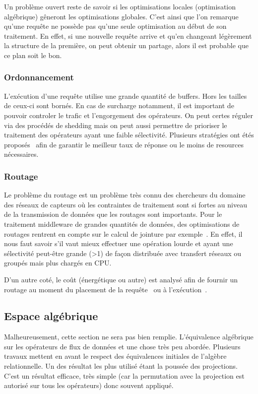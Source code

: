 Un problème ouvert reste de savoir si les optimisations locales (optimisation algébrique) gêneront les optimisations globales. C'est ainsi que l'on remarque qu'une requête ne possède pas qu'une seule optimisation au début de son traitement. En effet, si une nouvelle requête arrive et qu'en changeant légèrement la structure de la première, on peut obtenir un partage, alors il est probable que ce plan soit le bon.

\subsubsection{Ordonnancement}
L'exécution d'une requête utilise une grande quantité de buffers. Hors les tailles de ceux-ci sont bornés. En cas de surcharge notamment, il est important de pouvoir controler le trafic et l'engorgement des opérateurs. On peut certes réguler via des procédés de shedding mais on peut aussi permettre de prioriser le traitement des opérateurs ayant une faible sélectivité. Plusieurs stratégies ont étés proposés~\cite{Babcock:chain, Jiang:scheduling} afin de garantir le meilleur taux de réponse ou le moins de resources nécessaires.

\subsubsection{Routage}
Le problème du routage est un problème très connu des chercheurs du domaine des réseaux de capteurs où les contraintes de traitement sont si fortes au niveau de la transmission de données que les routages sont importants. Pour le traitement middleware de grandes quantités de données, des optimisations de routages rentrent en compte sur le calcul de jointure par exemple~\cite{Zhou:pmjoin}. En effet, il nous faut savoir s'il vaut mieux effectuer une opération lourde et ayant une sélectivité peut-être grande (>1) de façon distribuée avec transfert réseaux ou groupés mais plus chargés en CPU. 

D'un autre coté, le coût (énergétique ou autre) est analysé afin de fournir un routage au moment du placement de la requête~\cite{Galpin:snee} ou à l'exécution~\cite{Madden:tinydb}.

\subsection{Espace algébrique}
Malheureusement, cette section ne sera pas bien remplie. L'équivalence algébrique sur les opérateurs de flux de données et une chose très peu abordée. Plusieurs travaux mettent en avant le respect des équivalences initiales de l'algèbre relationnelle. Un des résultat les plus utilisé étant la poussée des projections. C'est un résultat efficace, très simple (car la permutation avec la projection est autorisé sur tous les opérateurs) donc souvent appliqué. 

